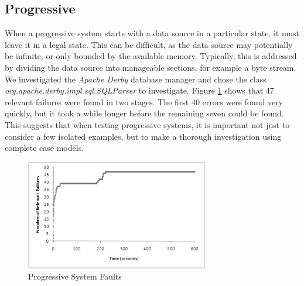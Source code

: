 \documentclass[runningheads,a4paper]{llncs}
\begin{document}
\subsection*{Progressive}
When a progressive system starts with a data source in a particular state, it must leave it in a legal state. This can be difficult, as the data source may potentially be infinite, or only bounded by the available memory. Typically, this is addressed by dividing the data source into manageable sections, for example a byte stream. We investigated the \emph{Apache Derby} database manager and chose the class \emph{org.apache.derby.impl.sql.SQLParser} to investigate. Figure \ref{progressive} shows that 47 relevant failures were found in two stages. The first 40 errors were found very quickly, but it took a while longer before the remaining seven could be found. This suggests that when testing progressive systems, it is important not just to consider a few isolated examples, but to make a thorough investigation using complete case models.
\begin{figure}[!h]
\centering
\includegraphics[width=80mm]{figures/progressive.eps}
\caption{Progressive System Faults}
\label{progressive}
\end{figure}
\end{document}
